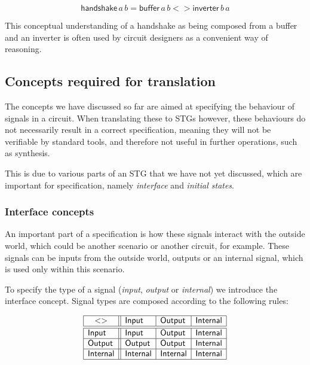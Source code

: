 \documentclass[british,conference,compsoc]{IEEEtran}
\begin{document}
\[
\mathsf{handshake}\,a\, b=\mathsf{buffer}\,a\, b <>\mathsf{inverter}\,b\, a
\]

\vspace{-1mm}

This conceptual understanding of a handshake as being composed
from a buffer and an inverter is often used by circuit designers as
a convenient way of reasoning.

\vspace{-2mm}

\subsection{Concepts required for translation\label{sub:trans-concepts}}

\vspace{-2mm}

The concepts we have discussed so far are aimed at specifying the behaviour of 
signals in a circuit. When translating these to STGs however, these behaviours 
do not necessarily result in a correct specification, meaning they will not be 
verifiable by standard tools, and therefore not useful in further operations, 
such as synthesis.

This is due to various parts of an STG that we have not yet discussed, which 
are important for specification, namely \emph{interface} and 
\emph{initial states}.

\vspace{-3mm}

\subsubsection{Interface concepts\label{sub:interface}} 

An important part of a specification is how these signals interact with the 
outside world, which could be another scenario or another circuit, for example.
These signals can be inputs from the outside world, outputs or an internal 
signal, which is used only within this scenario. 

To specify the type of a signal (\emph{input},
\emph{output} or \emph{internal}) we introduce the \textsf{interface} concept.
Signal types are composed according to the following rules:

\vspace{-2mm}

\[
\begin{array}{|l||l|l|l|}
\hline
\multicolumn{1}{|c||}{<>} & \mathsf{Input} & \mathsf{Output} &
\mathsf{Internal} \\ \hline \hline
\mathsf{Input} & \mathsf{Input} & \mathsf{Output} & \mathsf{Internal} \\ \hline
\mathsf{Output} & \mathsf{Output} & \mathsf{Output} & \mathsf{Internal} \\
\hline
\mathsf{Internal}& \mathsf{Internal} & \mathsf{Internal} & \mathsf{Internal} \\
\hline
\end{array}
\]
\end{document}
